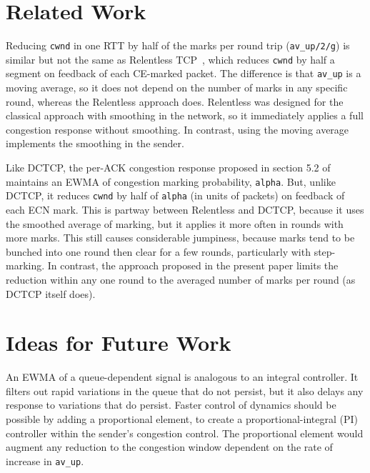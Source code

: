 
\section{Related Work}\label{prresp_related}

Reducing \texttt{cwnd} in one RTT by half of the marks per round trip (\texttt{av\_up/2/g}) is similar but not the same as Relentless TCP~\cite{Mathis09:Relentless}, which reduces \texttt{cwnd} by half a segment on feedback of each CE-marked packet. The difference is that \texttt{av\_up} is a moving average, so it does not depend on the number of marks in any specific round, whereas the Relentless approach does. Relentless was designed for the classical approach with smoothing in the network, so it immediately applies a full congestion response without smoothing. In contrast, using the moving average implements the smoothing in the sender.

Like DCTCP, the per-ACK congestion response proposed in section 5.2 of \cite{Alizadeh11:DCTCP_Analysis} maintains an EWMA of congestion marking probability, \texttt{alpha}. But, unlike DCTCP, it reduces \texttt{cwnd} by half of \texttt{alpha} (in units of packets) on feedback of each ECN mark. This is partway between Relentless and DCTCP, because it uses the smoothed average of marking, but it applies it more often in rounds with more marks. This still causes considerable jumpiness, because marks tend to be bunched into one round then clear for a few rounds, particularly with step-marking. In contrast, the approach proposed in the present paper limits the reduction within any one round to the averaged number of marks per round (as DCTCP itself does). %

\section{Ideas for Future Work}\label{prresp_future}

An EWMA of a queue-dependent signal is analogous to an integral controller. It filters out rapid variations in the queue that do not persist, but it also delays any response to variations that do persist. Faster control of dynamics should be possible by adding a proportional element, to create a proportional-integral (PI) controller within the sender's congestion control. The proportional element would augment any reduction to the congestion window dependent on the rate of increase in \texttt{av\_up}.

